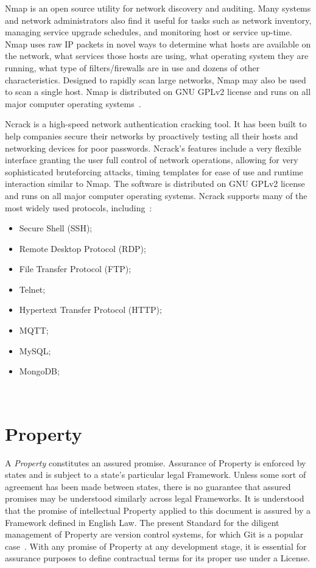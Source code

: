 \documentclass[11pt, oneside]{book}   	%
\begin{document}
Nmap is an open source utility for network discovery and auditing.
Many systems and network administrators also find it useful for tasks such as network inventory, managing service upgrade schedules, and monitoring host or service up-time.
Nmap uses raw IP packets in novel ways to determine what hosts are available on the network, what services those hosts are using, what operating system they are running, what type of filters/firewalls are in use and dozens of other characteristics.
Designed to rapidly scan large networks, Nmap may also be used to scan a single host.
Nmap is distributed on GNU GPLv2 license and runs on all major computer operating systems~\cite{nmap}.\

Ncrack is a high-speed network authentication cracking tool.
It has been built to help companies secure their networks by proactively testing all their hosts and networking devices for poor passwords.
Ncrack's features include a very flexible interface granting the user full control of network operations, allowing for very sophisticated bruteforcing attacks, timing templates for ease of use and runtime interaction similar to Nmap.
The software is distributed on GNU GPLv2 license and runs on all major computer operating systems.
Ncrack supports many of the most widely used protocols, including~\cite{ncrack}:
\begin{itemize}
	\item Secure Shell (SSH);
	\item Remote Desktop Protocol (RDP);
	\item File Transfer Protocol (FTP);
	\item Telnet;
	\item Hypertext Transfer Protocol (HTTP);
	\item MQTT;
	\item MySQL;
	\item MongoDB;
\end{itemize}\

\section{Property}
A \emph{Property} constitutes an assured promise.
Assurance of Property is enforced by states and is subject to a state's particular legal Framework.
Unless some sort of agreement has been made between states, there is no guarantee that assured promises may be understood similarly across legal Frameworks.
It is understood that the promise of intellectual Property applied to this document is assured by a Framework defined in English Law.
The present Standard for the diligent management of Property are version control systems, for which Git is a popular case~\cite{git}.
With any promise of Property at any development stage, it is essential for assurance purposes to define contractual terms for its proper use under a License.
\end{document}
